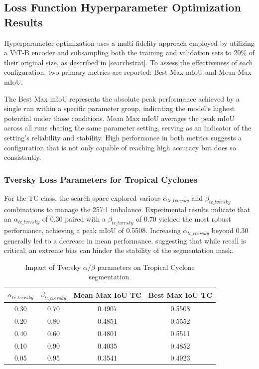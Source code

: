 \subsection{Loss Function Hyperparameter Optimization Results}

Hyperparameter optimization uses a multi-fidelity approach employed by utilizing a ViT-B encoder and subsampling both the training and validation sets to 20\% of their original size, as described in \autoref{searchstrat}. To assess the effectiveness of each configuration, two primary metrics are reported: Best Max mIoU and Mean Max mIoU. 

The Best Max mIoU represents the absolute peak performance achieved by a single run within a specific parameter group, indicating the model's highest potential under those conditions. Mean Max mIoU averages the peak mIoU across all runs sharing the same parameter setting, serving as an indicator of the setting's reliability and stability. High performance in both metrics suggests a configuration that is not only capable of reaching high accuracy but does so consistently.
\subsubsection{Tversky Loss Parameters for Tropical Cyclones}
For the TC class, the search space explored various $\alpha_{tc\_tversky}$ and $\beta_{tc\_tversky}$ combinations to manage the 257:1 imbalance. Experimental results indicate that an $\alpha_{tc\_tversky}$ of 0.30 paired with a $\beta_{tc\_tversky}$ of 0.70 yielded the most robust performance, achieving a peak mIoU of 0.5508. Increasing $\alpha_{tc\_tversky}$ beyond 0.30 generally led to a decrease in mean performance, suggesting that while recall is critical, an extreme bias can hinder the stability of the segmentation mask.

\begin{table}[h]
\centering
\begin{tabular}{@{}cccc@{}}
\toprule
$\alpha_{tc\_tversky}$ & $\beta_{tc\_tversky}$ & Mean Max IoU TC & Best Max IoU TC\\ \midrule
0.30 & 0.70 & 0.4907 & 0.5508 \\
0.20 & 0.80 & 0.4851 & 0.5552 \\
0.40 & 0.60 & 0.4801 & 0.5511 \\
0.10 & 0.90 & 0.4035 & 0.4852 \\
0.05 & 0.95 & 0.3541 & 0.4923 \\ \bottomrule
\end{tabular}
\caption{Impact of Tversky $\alpha/\beta$ parameters on Tropical Cyclone segmentation.}
\end{table}

